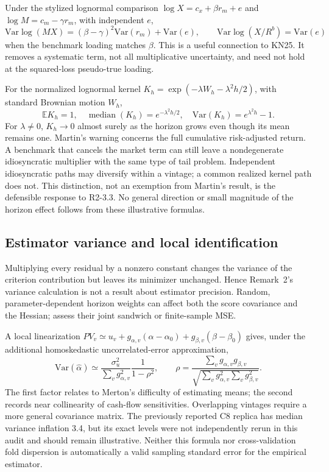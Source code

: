 \documentclass[11pt]{article}
\newcommand{\E}{\mathbb{E}}
\newcommand{\Var}{\mathrm{Var}}
\theoremstyle{plain}
\theoremstyle{definition}
\begin{document}
Under the stylized lognormal comparison
$\log X=c_x+\beta r_m+e$ and $\log M=c_m-\gamma r_m$, with independent $e$,
\[
\Var\log(MX)=(\beta-\gamma)^2\Var(r_m)+\Var(e),\qquad
\Var\log(X/R^b)=\Var(e)
\]
when the benchmark loading matches $\beta$. This is a useful connection to KN25. It removes a systematic term, not all multiplicative uncertainty, and need not hold at the squared-loss pseudo-true loading.

For the normalized lognormal kernel $K_h=\exp(-\lambda W_h-\lambda^2h/2)$, with standard Brownian motion $W_h$,
\[
\E K_h=1,\quad \operatorname{median}(K_h)=e^{-\lambda^2h/2},\quad
\Var(K_h)=e^{\lambda^2h}-1.
\]
For $\lambda\ne0$, $K_h\to0$ almost surely as the horizon grows even though its mean remains one. Martin's warning concerns the full cumulative risk-adjusted return. A benchmark that cancels the market term can still leave a nondegenerate idiosyncratic multiplier with the same type of tail problem. Independent idiosyncratic paths may diversify within a vintage; a common realized kernel path does not. This distinction, not an exemption from Martin's result, is the defensible response to R2-3.3. No general direction or small magnitude of the horizon effect follows from these illustrative formulas.

\subsection{Estimator variance and local identification}
\label{sec:auditD}

Multiplying every residual by a nonzero constant changes the variance of the criterion contribution but leaves its minimizer unchanged. Hence Remark~2's variance calculation is not a result about estimator precision. Random, parameter-dependent horizon weights can affect both the score covariance and the Hessian; assess their joint sandwich or finite-sample MSE.

A local linearization $PV_v\simeq u_v+g_{\alpha,v}(\alpha-\alpha_0)+g_{\beta,v}(\beta-\beta_0)$ gives, under the additional homoskedastic uncorrelated-error approximation,
\[
\Var(\hat\alpha)\simeq\frac{\sigma_u^2}{\sum_v g_{\alpha,v}^2}\frac{1}{1-\rho^2},\qquad
\rho=\frac{\sum_v g_{\alpha,v}g_{\beta,v}}{\sqrt{\sum_vg_{\alpha,v}^2\sum_vg_{\beta,v}^2}}.
\]
The first factor relates to Merton's difficulty of estimating means; the second records near collinearity of cash-flow sensitivities. Overlapping vintages require a more general covariance matrix. The previously reported C8 replica has median variance inflation 3.4, but its exact levels were not independently rerun in this audit and should remain illustrative. Neither this formula nor cross-validation fold dispersion is automatically a valid sampling standard error for the empirical estimator.
\end{document}
